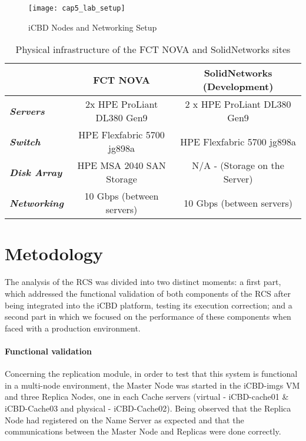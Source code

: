 \begin{figure}[htbp]
	\centering
	\texttt{[image: cap5\_lab\_setup]}
	\caption{iCBD Nodes and Networking Setup}
	\label{fig:eval_setup}
\end{figure}

\begin{table}[htpb]
\centering
\begin{tabular}{lcc}
                             & \textbf{FCT NOVA}          & \textbf{SolidNetworks (Development)}              \\ \hline
\textit{\textbf{Servers}}    & 2x HPE ProLiant DL380 Gen9 & 2 x HPE ProLiant DL380 Gen9   \\
\textit{\textbf{Switch}}     & HPE Flexfabric 5700 jg898a & HPE Flexfabric 5700 jg898a    \\
\textit{\textbf{Disk Array}} & HPE MSA 2040 SAN Storage   & N/A - (Storage on the Server) \\
\textit{\textbf{Networking}} & 10 Gbps (between servers)  & 10 Gbps (between servers)     \\ \hline
\end{tabular}
\caption{Physical infrastructure of the FCT NOVA and SolidNetworks sites}
\end{table}


\section{Metodology}
\label{sec:eval_method}

The analysis of the RCS was divided into two distinct moments: a first part, which addressed the functional validation of both components of the RCS after being integrated into the iCBD platform, testing its execution correction; and a second part in which we focused on the performance of these components when faced with a production environment.

\paragraph{Functional validation}
\label{par:eval_func_val}

Concerning the replication module, in order to test that this system is functional in a multi-node environment, the Master Node was started in the iCBD-imgs VM and three Replica Nodes, one in each Cache servers (virtual - iCBD-cache01 \& iCBD-Cache03 and physical - iCBD-Cache02). Being observed that the Replica Node had registered on the Name Server as expected and that the communications between the Master Node and Replicas were done correctly.

